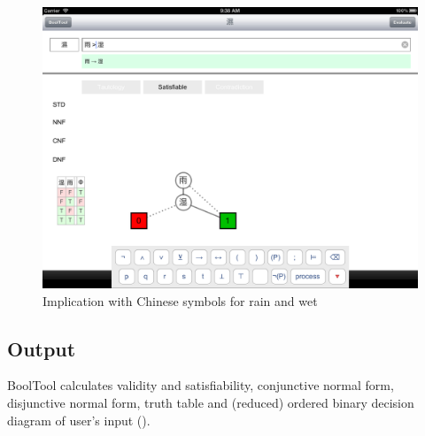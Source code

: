 \begin{figure}[htbp]
\begin{center}
\includegraphics[scale=0.18,trim=0 43cm 0cm 0, clip=true]{concept/RainHD.png}
\caption{Implication with Chinese symbols for rain and wet}
\label{fig:BoolToolChineseInput}
\end{center}
\end{figure}


\subsection{Output}

BoolTool calculates validity and satisfiability, 
conjunctive normal form, 
disjunctive normal form, 
truth table and 
(reduced) ordered binary decision diagram 
of user's input (). 

